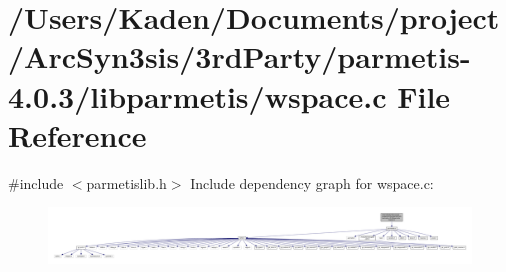 \hypertarget{a00984}{}\section{/\+Users/\+Kaden/\+Documents/project/\+Arc\+Syn3sis/3rd\+Party/parmetis-\/4.0.3/libparmetis/wspace.c File Reference}
\label{a00984}
{\ttfamily \#include $<$parmetislib.\+h$>$}\newline
Include dependency graph for wspace.\+c\+:\nopagebreak
\begin{figure}[H]
\begin{center}
\leavevmode
\includegraphics[width=350pt]{a00985}
\end{center}
\end{figure}
